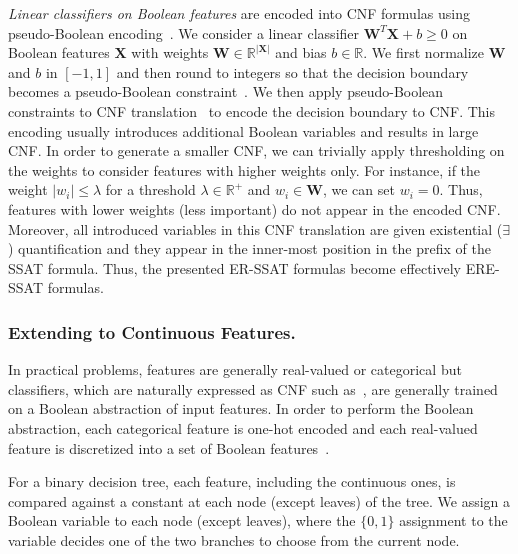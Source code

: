 \textit{Linear classifiers on Boolean features} are encoded into CNF formulas using pseudo-Boolean encoding~\cite{philipp2015pblib}. We consider a linear classifier  $ \mathbf{W}^T \mathbf{X} + b \ge 0 $ on Boolean features $ \mathbf{X} $ with weights $ \mathbf{W} \in \mathbb{R}^{|\mathbf{X}|} $ and bias $ b \in \mathbb{R} $.  We first normalize $ \mathbf{W} $ and $ b $ in $ [-1,1] $ and then round to integers so that the decision boundary becomes a pseudo-Boolean constraint~\cite{roussel2009pseudo}.  We then apply  pseudo-Boolean constraints to CNF translation~\cite{philipp2015pblib} to encode the decision boundary to CNF. This encoding usually introduces additional Boolean variables and results in large CNF. In order to generate a smaller CNF, we can trivially apply thresholding  on the weights to consider features with higher weights only. For instance, if the weight $  |w_i| \le \lambda $ for a threshold $ \lambda  \in \mathbb{R}^+$ and $ w_i \in \mathbf{W} $, we can set $ w_i = 0 $. Thus, features with lower weights (less important) do not appear in the encoded CNF.  Moreover, all introduced variables in this CNF translation are given existential ($ \exists $) quantification and they appear in the inner-most position in the prefix of the SSAT formula. Thus, the presented ER-SSAT formulas become effectively ERE-SSAT formulas.

\subsubsection{Extending to Continuous Features.}
In practical problems, features are generally real-valued or categorical but classifiers, which are naturally expressed as CNF such as~\cite{GMM20}, are generally trained on a Boolean abstraction of input features. In order to perform the Boolean abstraction, each categorical feature is one-hot encoded and each real-valued feature is discretized into a set of Boolean features~\cite{LKCL2019,GMM20}. 

For a binary decision tree, each feature, including the continuous ones, is compared against a constant at each node (except leaves) of the tree. We assign a Boolean variable to each node (except leaves), where the $ \{0,1\} $ assignment to the variable decides one of the two branches to choose from the current node.  

